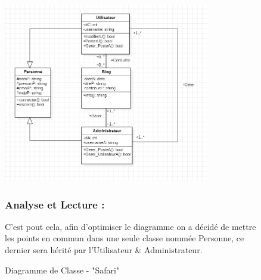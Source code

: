 \begin{enumerate}
 \renewcommand{\thefigure}{2}
\begin{figure}[htbp]
    \centering
   \includegraphics[width=0.8\textwidth]{images/image1.png} 
    \caption{Diagramme de Classe - "Safari"}

\subsubsection{Analyse et Lecture  :}

C’est pout cela, afin d’optimiser le diagramme on a décidé de mettre les 
points en commun dans une seule classe nommée Personne, ce dernier 
sera hérité par l'Utilisateur \& Administrateur. 
    \label{fig:Diagramme de classe - "Safari"}
\end{figure}

\end{enumerate}
